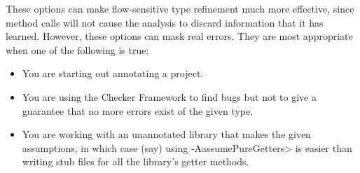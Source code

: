 These options can make
flow-sensitive type refinement much more effective, since method calls will
not cause the analysis to discard information that it has learned.
However, these options can mask real errors.  They are most appropriate when one
of the following is true:
\begin{itemize}
\item
  You are starting out annotating a project.
\item
  You are using the Checker Framework to find bugs but not to give a
  guarantee that no more errors exist of the given type.
\item
  You are working with an unannotated library that makes the given
  assumptions, in which case (say) using \<-AassumePureGetters> is easier
  than writing stub files for all the library's getter methods.
\end{itemize}


